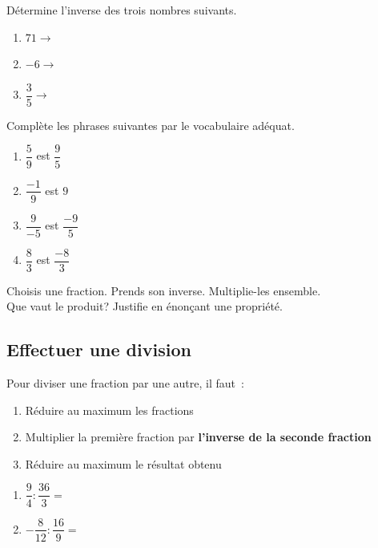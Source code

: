 \documentclass[../math2.tex]{subfiles}
\begin{document}
\exemples Détermine l'inverse des trois nombres suivants.
\begin{enumerate} [cols=3]
  \item $71 \rightarrow$
  \item $-6 \rightarrow$
  \item $\dfrac{3}{5} \rightarrow$
\end{enumerate}

\begin{exercise}
  Complète les phrases suivantes par le vocabulaire adéquat.
    \begin{enumerate} [cols=2, itemsep=1cm] 
    \item $\dfrac{5}{9}$ est \dotfill$\dfrac{9}{5}$
    \item $\dfrac{-1}{9}$ est \dotfill$9$
    \item $\dfrac{9}{-5}$ est \dotfill$\dfrac{-9}{5}$
    \item $\dfrac{8}{3}$ est \dotfill$\dfrac{-8}{3}$ 
  \end{enumerate}
\end{exercise}

\begin{exercise}
  Choisis une fraction. Prends son inverse. Multiplie-les ensemble.\\
  Que vaut le produit? Justifie en énonçant une propriété.
\end{exercise}

\newpage

\subsection{Effectuer une division}
Pour diviser une fraction par une autre, il faut~:
\begin{enumerate}[label=\arabic*]
  \item Réduire au maximum les fractions
  \item Multiplier la première fraction par \textbf{l'inverse de la seconde fraction}
  \item Réduire au maximum le résultat obtenu
\end{enumerate}

\exemple

\begin{enumerate}[cols=2, itemsep=3cm]
  \item $\dfrac{9}{4} : \dfrac{36}{3}=$
  \item $-\dfrac{8}{12} : \dfrac{16}{9}=$
\end{enumerate}
\end{document}
